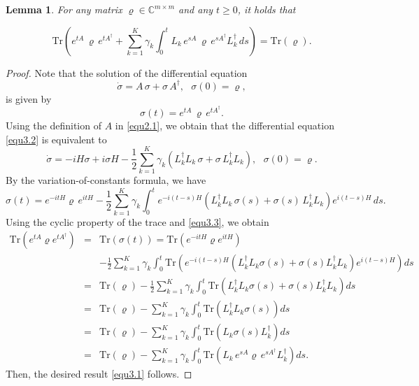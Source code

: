 \documentclass[preprint,3p,compress,12pt]{elsarticle}
\numberwithin{equation}{section}
\newtheorem{lemma}[theorem]{Lemma}
\numberwithin{figure}{section}
\begin{document}
\begin{lemma}\label{lem3.1}
  For any matrix $\varrho\in \mathbb{C}^{m\times m}$ and any $t\geq0$, it holds that
\end{lemma}
\begin{equation}\label{equ3.1}
    \mbox{Tr}\left(e^{t A} \, \varrho \, e^{t A^{\dag}}+\sum_{k=1}^K\gamma_k
  \int_0^{t}L_k \, e^{sA} \, \varrho \, e^{sA^{\dag}} L_k^{\dag} \, ds\right)=\mbox{Tr}(\varrho).
  \end{equation}
\begin{proof}
  Note that the solution of the differential equation
  \begin{equation}\label{equ3.2}
    \dot{\sigma}=A \, \sigma+\sigma \, A^{\dag},~~~\sigma(0)=\varrho ,
  \end{equation}
  is given by
  \begin{equation}\label{equ3.3}
    \sigma(t)=e^{tA} \, \varrho \, e^{tA^{\dag}}.
  \end{equation}
  Using the definition of $A$ in \eqref{equ2.1}, we obtain that the differential equation \eqref{equ3.2} is equivalent to
  \begin{equation*}
    \dot{\sigma}=-i H\sigma+i\sigma H-\frac{1}{2}\sum_{k=1}^K\gamma_k\left(L_k^{\dag}L_k \, \sigma+\sigma \, L_k^{\dag}L_k\right),~~~\sigma(0)=\varrho.
  \end{equation*}
  By the variation-of-constants formula, we have
  \begin{equation*}
    \sigma(t)=e^{-itH}\varrho \, e^{itH}-\frac{1}{2}\sum_{k=1}^K\gamma_k\int_0^te^{-i(t-s)H}\left(L_k^{\dag}L_k \, \sigma(s)+\sigma(s) \, L_k^{\dag}L_k\right) e^{i(t-s)H} \, ds.
  \end{equation*}
  Using the cyclic property of the trace and \eqref{equ3.3},
   we obtain
  \begin{eqnarray}\label{equ3.4}
    \mbox{Tr}(e^{tA}\varrho e^{tA^{\dag}})&=&\mbox{Tr}(\sigma(t))=\mbox{Tr}(e^{-itH}\varrho e^{itH})\nonumber\\
    &&-\frac{1}{2}\sum_{k=1}^K\gamma_k\int_0^t\mbox{Tr}\left(e^{-i(t-s)H}\left(L_k^{\dag}L_k\sigma(s)+\sigma(s) L_k^{\dag}L_k\right) e^{i(t-s)H}\right)ds\nonumber\\
    &=&\mbox{Tr}(\varrho)-\frac{1}{2}\sum_{k=1}^K\gamma_k\int_0^t\mbox{Tr}\left(L_k^{\dag}L_k\sigma(s)+\sigma(s) L_k^{\dag}L_k \right)ds\nonumber\\
    &=&\mbox{Tr}(\varrho)-\sum_{k=1}^K\gamma_k\int_0^t\mbox{Tr}\left(L_k^{\dag}L_k\sigma(s)\right)ds\nonumber\\
    &=&\mbox{Tr}(\varrho)-\sum_{k=1}^K\gamma_k\int_0^t\mbox{Tr}\left(L_k\sigma(s)L_k^{\dag}\right)ds\nonumber\\
    &=&\mbox{Tr}(\varrho)-\sum_{k=1}^K\gamma_k\int_0^t\mbox{Tr}\left(L_k \, e^{sA}\varrho \, e^{sA^{\dag}} L_k^{\dag}\right)ds.
  \end{eqnarray}
  Then, the desired result \eqref{equ3.1} follows.
\end{proof}
\end{document}
